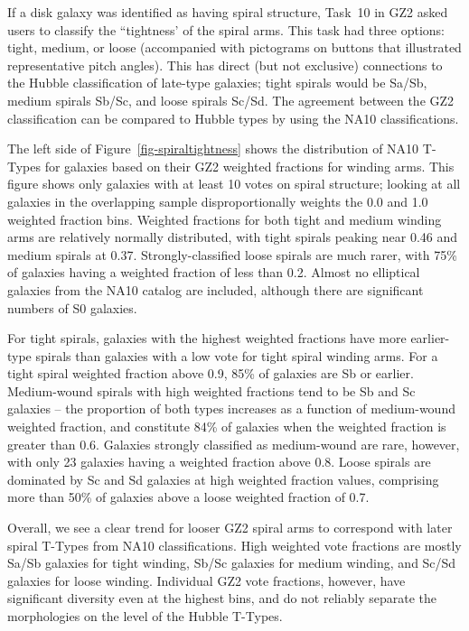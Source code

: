 \documentclass[useAMS,usenatbib]{mn2e}
\begin{document}
If a disk galaxy was identified as having spiral structure, Task~10 in GZ2 asked users to classify the ``tightness' of the spiral arms. This task had three options: tight, medium, or loose (accompanied with pictograms on buttons that illustrated representative pitch angles). This has direct (but not exclusive) connections to the Hubble classification of late-type galaxies; tight spirals would be Sa/Sb, medium spirals Sb/Sc, and loose spirals Sc/Sd. The agreement between the GZ2 classification can be compared to Hubble types by using the NA10 classifications. 

The left side of Figure~\ref{fig-spiraltightness} shows the distribution of NA10 T-Types for galaxies based on their GZ2 weighted fractions for winding arms. This figure shows only galaxies with at least 10 votes on spiral structure; looking at all galaxies in the overlapping sample disproportionally weights the 0.0 and 1.0 weighted fraction bins. Weighted fractions for both tight and medium winding arms are relatively normally distributed, with tight spirals peaking near 0.46 and medium spirals at 0.37. Strongly-classified loose spirals are much rarer, with 75\% of galaxies having a weighted fraction of less than 0.2. Almost no elliptical galaxies from the NA10 catalog are included, although there are significant numbers of S0 galaxies. 

For tight spirals, galaxies with the highest weighted fractions have more earlier-type spirals than galaxies with a low vote for tight spiral winding arms. For a tight spiral weighted fraction above 0.9, 85\% of galaxies are Sb or earlier. Medium-wound spirals with high weighted fractions tend to be Sb and Sc galaxies -- the proportion of both types increases as a function of medium-wound weighted fraction, and constitute 84\% of galaxies when the weighted fraction is greater than 0.6. Galaxies strongly classified as medium-wound are rare, however, with only 23 galaxies having a weighted fraction above 0.8.  Loose spirals are dominated by Sc and Sd galaxies at high weighted fraction values, comprising more than 50\% of galaxies above a loose weighted fraction of 0.7. 

Overall, we see a clear trend for looser GZ2 spiral arms to correspond with later spiral T-Types from NA10 classifications. High weighted vote fractions are mostly Sa/Sb galaxies for tight winding, Sb/Sc galaxies for medium winding, and Sc/Sd galaxies for loose winding. Individual GZ2 vote fractions, however, have significant diversity even at the highest bins, and do not reliably separate the morphologies on the level of the Hubble T-Types. 
\end{document}
